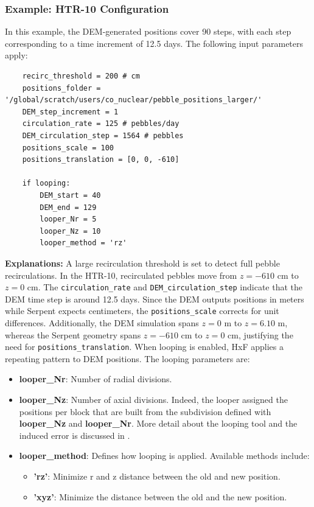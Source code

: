 \documentclass{article}
\begin{document}
\subsubsection{Example: HTR-10 Configuration}
In this example, the DEM-generated positions cover 90 steps, with each step corresponding to a time increment of 12.5 days. The following input parameters apply:

\begin{verbatim}
    recirc_threshold = 200 # cm
    positions_folder = '/global/scratch/users/co_nuclear/pebble_positions_larger/'
    DEM_step_increment = 1
    circulation_rate = 125 # pebbles/day
    DEM_circulation_step = 1564 # pebbles
    positions_scale = 100
    positions_translation = [0, 0, -610]
    
    if looping:
        DEM_start = 40
        DEM_end = 129
        looper_Nr = 5
        looper_Nz = 10
        looper_method = 'rz'
\end{verbatim}

\textbf{Explanations:}  
A large recirculation threshold is set to detect full pebble recirculations. In the HTR-10, recirculated pebbles move from $z=-610$ cm to $z=0$ cm. The \texttt{circulation\_rate} and \texttt{DEM\_circulation\_step} indicate that the DEM time step is around 12.5 days. Since the DEM outputs positions in meters while Serpent expects centimeters, the \texttt{positions\_scale} corrects for unit differences. Additionally, the DEM simulation spans $z=0$ m to $z=6.10$ m, whereas the Serpent geometry spans $z=-610$ cm to $z=0$ cm, justifying the need for \texttt{positions\_translation}.
When looping is enabled, HxF applies a repeating pattern to DEM positions. The looping parameters are:
\begin{itemize}
    \item \textbf{looper\_Nr}: Number of radial divisions.
    \item \textbf{looper\_Nz}: Number of axial divisions.
Indeed, the looper assigned the positions per block that are built from the subdivision defined with \textbf{looper\_Nz} and \textbf{looper\_Nr}. More detail about the looping tool and the induced error is discussed in \cite{Yves_M&C}.
    \item \textbf{looper\_method}: Defines how looping is applied. Available methods include:
    \begin{itemize}
        \item \textbf{'rz'}: Minimize r and z distance between the old and new position.
        \item \textbf{'xyz'}: Minimize the distance between the old and the new position.
    \end{itemize}
\end{itemize}
\end{document}
